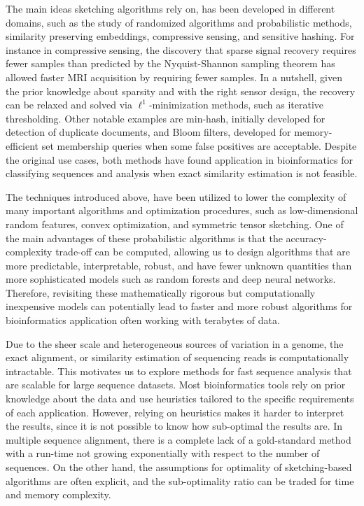 
The main ideas sketching algorithms rely on, has been developed in different domains, such as the study of randomized algorithms and probabilistic methods, similarity preserving embeddings, compressive sensing, and sensitive hashing. For instance in compressive sensing, the discovery that sparse signal recovery requires fewer samples than predicted by the Nyquist-Shannon sampling theorem has allowed faster MRI acquisition by requiring fewer samples. In a nutshell, given the prior knowledge about sparsity and with the right sensor design, the recovery can be relaxed and solved via $\ell^1$-minimization methods, such as iterative thresholding. Other notable examples are min-hash, initially developed for detection of duplicate documents, and Bloom filters, developed for memory-efficient set membership queries when some false positives are acceptable. Despite the original use cases, both methods have found application in bioinformatics for classifying sequences and analysis when exact similarity estimation is not feasible. 


The techniques introduced above, have been utilized to lower the complexity of many important algorithms and optimization procedures, such as low-dimensional random features, convex optimization, and symmetric tensor sketching.
One of the main advantages of these probabilistic algorithms is that the accuracy-complexity trade-off can be computed, allowing us to design algorithms that are more predictable, interpretable, robust, and have fewer unknown quantities than more sophisticated models such as random forests and deep neural networks. 
Therefore, revisiting these mathematically rigorous but computationally inexpensive models can potentially lead to faster and more robust algorithms for bioinformatics application often working with terabytes of data.



Due to the sheer scale and heterogeneous sources of variation in a genome, the exact alignment, or similarity estimation of sequencing reads is computationally intractable. This motivates us to explore methods for fast sequence analysis that are scalable for large sequence datasets. Most bioinformatics tools rely on prior knowledge about the data and use heuristics tailored to the specific requirements of each application. 
However, relying on heuristics makes it harder to interpret the results, since it is not possible to know how sub-optimal the results are. 
In multiple sequence alignment, there is a complete lack of a gold-standard method with a run-time not growing exponentially with respect to the number of sequences. On the other hand, the assumptions for optimality of sketching-based algorithms are often explicit, and the sub-optimality ratio can be traded for time and memory complexity. 



